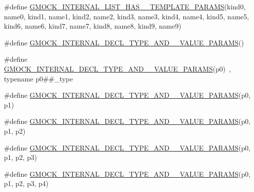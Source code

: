 \begin{DoxyCompactItemize}
\item 
\#define \mbox{\hyperlink{googletest-master_2googlemock_2include_2gmock_2gmock-generated-actions_8h_ab216ed7cf202e5c97e4a4e4115c416d2}{G\+M\+O\+C\+K\+\_\+\+I\+N\+T\+E\+R\+N\+A\+L\+\_\+\+L\+I\+S\+T\+\_\+\+H\+A\+S\+\_\+\_\+\+T\+E\+M\+P\+L\+A\+T\+E\+\_\+\+P\+A\+R\+A\+MS}}(kind0,  name0,  kind1,  name1,  kind2,  name2,  kind3,  name3,  kind4,  name4,  kind5,  name5,  kind6,  name6,  kind7,  name7,  kind8,  name8,  kind9,  name9)
\item 
\#define \mbox{\hyperlink{googletest-master_2googlemock_2include_2gmock_2gmock-generated-actions_8h_a9eda3221eac423c7026d63fc486d1296}{G\+M\+O\+C\+K\+\_\+\+I\+N\+T\+E\+R\+N\+A\+L\+\_\+\+D\+E\+C\+L\+\_\+\+T\+Y\+P\+E\+\_\+\+A\+N\+D\+\_\+\_\+\+V\+A\+L\+U\+E\+\_\+\+P\+A\+R\+A\+MS}}()
\item 
\#define \mbox{\hyperlink{googletest-master_2googlemock_2include_2gmock_2gmock-generated-actions_8h_a462396713d8024e37a66fb12abd87a00}{G\+M\+O\+C\+K\+\_\+\+I\+N\+T\+E\+R\+N\+A\+L\+\_\+\+D\+E\+C\+L\+\_\+\+T\+Y\+P\+E\+\_\+\+A\+N\+D\+\_\+\_\+\+V\+A\+L\+U\+E\+\_\+\+P\+A\+R\+A\+MS}}(p0)~, typename p0\#\#\+\_\+type
\item 
\#define \mbox{\hyperlink{googletest-master_2googlemock_2include_2gmock_2gmock-generated-actions_8h_a8de8a9ba55313f4f4ba936c28ffe0d93}{G\+M\+O\+C\+K\+\_\+\+I\+N\+T\+E\+R\+N\+A\+L\+\_\+\+D\+E\+C\+L\+\_\+\+T\+Y\+P\+E\+\_\+\+A\+N\+D\+\_\+\_\+\+V\+A\+L\+U\+E\+\_\+\+P\+A\+R\+A\+MS}}(p0,  p1)
\item 
\#define \mbox{\hyperlink{googletest-master_2googlemock_2include_2gmock_2gmock-generated-actions_8h_a2def1ab63696280e9b8c20ed176d0c92}{G\+M\+O\+C\+K\+\_\+\+I\+N\+T\+E\+R\+N\+A\+L\+\_\+\+D\+E\+C\+L\+\_\+\+T\+Y\+P\+E\+\_\+\+A\+N\+D\+\_\+\_\+\+V\+A\+L\+U\+E\+\_\+\+P\+A\+R\+A\+MS}}(p0,  p1,  p2)
\item 
\#define \mbox{\hyperlink{googletest-master_2googlemock_2include_2gmock_2gmock-generated-actions_8h_aff64ba07ea8171eb7bacb655127120f7}{G\+M\+O\+C\+K\+\_\+\+I\+N\+T\+E\+R\+N\+A\+L\+\_\+\+D\+E\+C\+L\+\_\+\+T\+Y\+P\+E\+\_\+\+A\+N\+D\+\_\+\_\+\+V\+A\+L\+U\+E\+\_\+\+P\+A\+R\+A\+MS}}(p0,  p1,  p2,  p3)
\item 
\#define \mbox{\hyperlink{googletest-master_2googlemock_2include_2gmock_2gmock-generated-actions_8h_a1f0b43fe98dabf52fa9dbffa0966d7f3}{G\+M\+O\+C\+K\+\_\+\+I\+N\+T\+E\+R\+N\+A\+L\+\_\+\+D\+E\+C\+L\+\_\+\+T\+Y\+P\+E\+\_\+\+A\+N\+D\+\_\+\_\+\+V\+A\+L\+U\+E\+\_\+\+P\+A\+R\+A\+MS}}(p0,  p1,  p2,  p3,  p4)
\item 

\end{DoxyCompactItemize}

